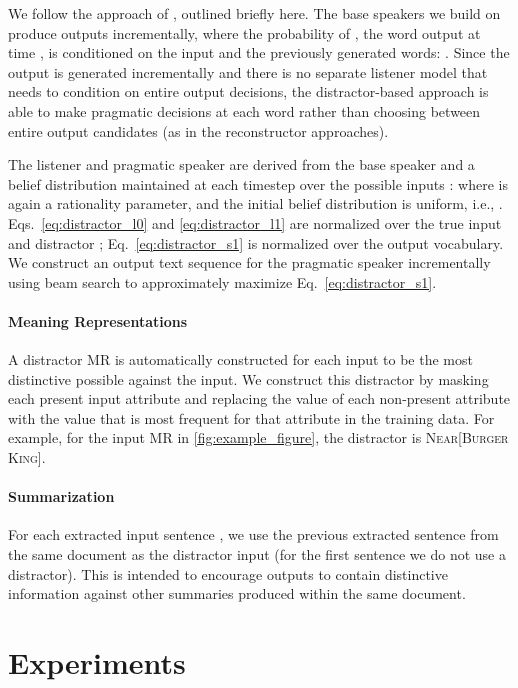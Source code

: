 \documentclass[11pt,a4paper]{article}
\newcommand{\ie}{i.e., }
\begin{document}
We follow the approach of , outlined briefly here.
The base speakers we build on produce outputs incrementally, where the probability of , the word output at time , is conditioned on the input and the previously generated words: .
Since the output is generated incrementally and there is no separate listener model that needs to condition on entire output decisions, the distractor-based approach is able to 
make pragmatic decisions at each word rather than choosing between entire output candidates (as in the reconstructor approaches).

The listener  and pragmatic speaker  are derived from the base speaker  and a belief  distribution  maintained at each timestep  over the possible inputs :
{
}where  is again a rationality parameter, and the initial belief distribution  is uniform, \ie . Eqs.\ \ref{eq:distractor_l0} and \ref{eq:distractor_l1} are normalized over the true input  and distractor ; 
Eq.\ \ref{eq:distractor_s1} is normalized over the output vocabulary. We construct an output text sequence for the pragmatic speaker  incrementally using beam search to approximately maximize Eq.\ \ref{eq:distractor_s1}.

\paragraph{Meaning Representations}
A distractor MR is automatically constructed for each input to be the most distinctive possible against the input. We construct this distractor by masking each present input attribute and replacing the value of each non-present attribute with the value that is most frequent for that attribute in the training data. For example, for the input MR in \autoref{fig:example_figure}, the distractor is \textsc{Near[Burger King]}. 

\paragraph{Summarization}
For each extracted input sentence , we use the previous extracted sentence  
from the same document as the distractor input  (for the first sentence we do not use a distractor).  
This is intended to encourage outputs  to contain distinctive information 
against other summaries produced 
within the same document.
 \section{Experiments}
\end{document}
